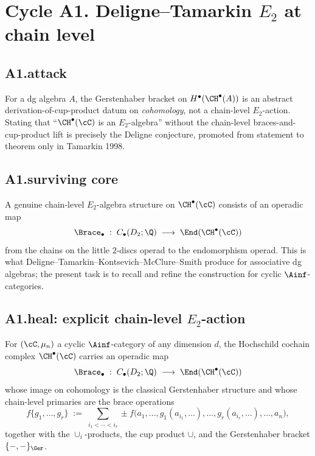 \section*{Cycle A1. Deligne--Tamarkin $E_2$ at chain level}

\subsection*{A1.attack}

For a dg algebra $A$, the Gerstenhaber bracket on
$H^\bullet(\CH^\bullet(A))$ is an abstract derivation-of-cup-product
datum on \emph{cohomology}, not a chain-level $E_2$-action. Stating that
``$\CH^\bullet(\cC)$ is an $E_2$-algebra'' without the chain-level
braces-and-cup-product lift is precisely the Deligne conjecture,
promoted from statement to theorem only in Tamarkin 1998.

\subsection*{A1.surviving core}

A genuine chain-level $E_2$-algebra structure on $\CH^\bullet(\cC)$
consists of an operadic map
\[
\Brace_\bullet\;:\;C_\bullet(D_2;\Q)\;\longrightarrow\;\End(\CH^\bullet(\cC))
\]
from the chains on the little $2$-discs operad to the endomorphism
operad. This is what Deligne--Tamarkin--Kontsevich--McClure--Smith
produce for associative dg algebras; the present task is to recall and
refine the construction for cyclic $\Ainf$-categories.

\subsection*{A1.heal: explicit chain-level $E_2$-action}

\begin{proposition}
\label{wave-cfg-prop:braces-action}
For $(\cC,\mu_n)$ a cyclic $\Ainf$-category of any dimension $d$, the
Hochschild cochain complex $\CH^\bullet(\cC)$ carries an operadic map
\[
\Brace_\bullet\;:\;C_\bullet(D_2;\Q)\;\longrightarrow\;\End(\CH^\bullet(\cC))
\]
whose image on cohomology is the classical Gerstenhaber structure and
whose chain-level primaries are the brace operations
\[
f\{g_1,\dots,g_r\}
\;:=\;\sum_{i_1<\cdots<i_r}
\pm f\bigl(a_1,\dots,g_1(a_{i_1},\ldots),\dots,
g_r(a_{i_r},\ldots),\dots,a_n\bigr),
\]
together with the $\cup_i$-products, the cup product $\cup$, and the
Gerstenhaber bracket $\{-,-\}_\Ger$.
\end{proposition}

